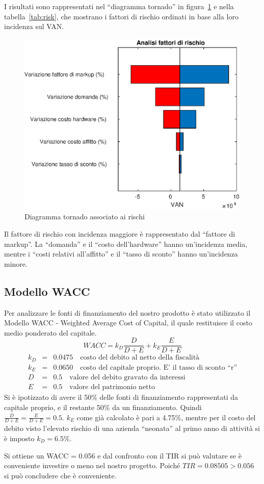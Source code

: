 I risultati sono rappresentati nel “diagramma tornado” in figura~\ref{tornado} e
nella tabella~\ref{tab:risk}, che mostrano i fattori di rischio ordinati in base
alla loro incidenza sul VAN.

%
\begin{figure}[!h]
\centering
\includegraphics[width=\textwidth]{figures/tornado}
\caption{Diagramma tornado associato ai rischi}
\label{tornado}
\end{figure}
%
Il fattore di rischio con incidenza maggiore è rappresentato dal “fattore
di markup”. La “domanda” e il “costo dell’hardware” hanno un’incidenza media,
mentre i “costi relativi all’affitto” e il “tasso di sconto” hanno un’incidenza
minore.
\subsection{Modello WACC}
Per analizzare le fonti di finanziamento del nostro prodotto è stato utilizzato
il Modello WACC - Weighted Average Cost of Capital, il quale restituisce il
costo medio ponderato del capitale.
\begin{displaymath}
WACC = k_D \frac{D}{D+E} + k_E \frac{E}{D+E}
\end{displaymath}
\begin{eqnarray*}
k_D &=& 0.0475 \quad \mbox{costo del debito al netto della fiscalità} \\
k_E &=& 0.0650 \quad \mbox{costo del capitale proprio. E’ il tasso di sconto “r”} \\
D &=& 0.5 \quad \mbox{valore del debito gravato da interessi} \\
E &=& 0.5 \quad \mbox{valore del patrimonio netto} 
\end{eqnarray*}
Si è ipotizzato di avere il 50\% delle fonti di finanziamento rappresentati da
capitale proprio, e il restante 50\% da un finanziamento. Quindi $\frac{D}{D+E} 
= \frac{E}{D+E} = 0.5$.  $k_E$ come già calcolato è pari a 4.75\%, mentre per il
costo del debito visto l’elevato rischio di una azienda “neonata” al primo anno
di attività si è imposto $k_D = 6.5\%$. 

Si ottiene un WACC = 0.056 e dal confronto con il TIR si può valutare se è
conveniente investire o meno nel nostro progetto. Poiché $TIR = 0.08505 > 0.056$
si può concludere che è conveniente.

